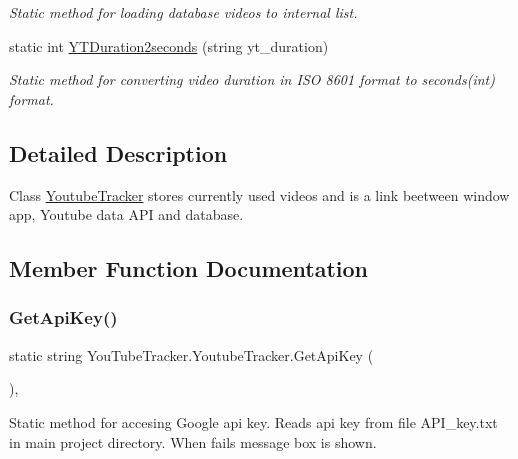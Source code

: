 \begin{DoxyCompactItemize}
\begin{DoxyCompactList}\small\item\em Static method for loading database videos to internal list. \end{DoxyCompactList}\item 
static int \mbox{\hyperlink{class_you_tube_tracker_1_1_youtube_tracker_a431b19f99b43d033603fb67b66dde65a}{Y\+T\+Duration2seconds}} (string yt\+\_\+duration)
\begin{DoxyCompactList}\small\item\em Static method for converting video duration in I\+SO 8601 format to seconds(int) format. \end{DoxyCompactList}\end{DoxyCompactItemize}


\subsection{Detailed Description}
Class {\ttfamily \mbox{\hyperlink{class_you_tube_tracker_1_1_youtube_tracker}{Youtube\+Tracker}}} stores currently used videos and is a link beetween window app, Youtube data A\+PI and database. 



\subsection{Member Function Documentation}
\mbox{\label{class_you_tube_tracker_1_1_youtube_tracker_a8e33afb1adb2d2a4a0b1d539f2631827}} 
\subsubsection{\texorpdfstring{Get\+Api\+Key()}{GetApiKey()}}
{\footnotesize\ttfamily static string You\+Tube\+Tracker.\+Youtube\+Tracker.\+Get\+Api\+Key (\begin{DoxyParamCaption}{ }\end{DoxyParamCaption})\hspace{0.3cm}{\ttfamily [inline]}, {\ttfamily [static]}}



Static method for accesing Google api key. Reads api key from file {\ttfamily A\+P\+I\+\_\+key.\+txt} in main project directory. When fails message box is shown. 

